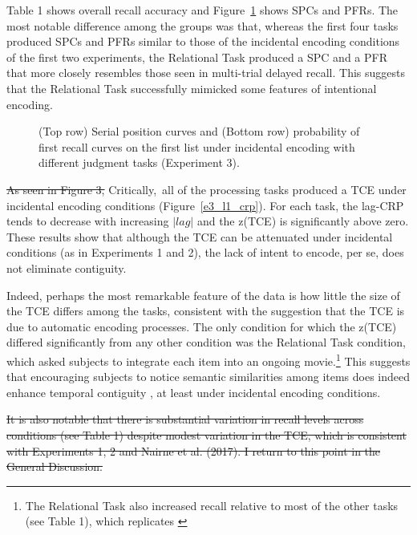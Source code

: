 \documentclass[man,natbib,floatsintext]{apa6} %
\begin{document}
\color{red}
Table 1 shows overall recall accuracy and Figure~\ref{e3_l1_spc} shows SPCs and PFRs. The most notable difference among the groups was that, whereas the first four tasks produced SPCs and PFRs similar to those of the incidental encoding conditions of the first two experiments, the Relational Task produced a SPC and a PFR that more closely resembles those seen in multi-trial delayed recall. This suggests that the Relational Task successfully mimicked some features of intentional encoding.

\begin{figure}
\caption{(Top row) Serial position curves and (Bottom row) probability of first recall curves on the first list under incidental encoding with different judgment tasks (Experiment 3). \spcpaneltext}
\label{e3_l1_spc}
\end{figure}

\color{black}

\st{As seen in Figure 3,}\color{red} Critically,\color{black}~all of the processing tasks produced a TCE under incidental encoding conditions \color{red}(Figure~\ref{e3_l1_crp})\color{black}. For each task, the lag-CRP tends to decrease with increasing $|lag|$ and the z(TCE) is significantly above zero. These results show that although the TCE can be attenuated under incidental conditions (as in Experiments 1 and 2), the lack of intent to encode, per se, does not eliminate contiguity.

Indeed, perhaps the most remarkable feature of the data is how little the size of the TCE differs among the tasks, consistent with the suggestion that the TCE is due to automatic encoding processes. The only condition for which the z(TCE) differed significantly from any other condition was the Relational Task condition, which asked subjects to integrate each item into an ongoing movie.\footnote{The Relational Task also increased recall relative to most of the other tasks (see Table 1), which replicates \citet{BowClar69}} This suggests that encouraging subjects to notice semantic similarities among items does indeed enhance temporal contiguity \citep{Hint16}, at least under incidental encoding conditions.

\st{It is also notable that there is substantial variation in recall levels across conditions (see Table 1) despite modest variation in the TCE, which is consistent with Experiments 1, 2 and Nairne et al. (2017). I return to this point in the General Discussion.}
\end{document}
